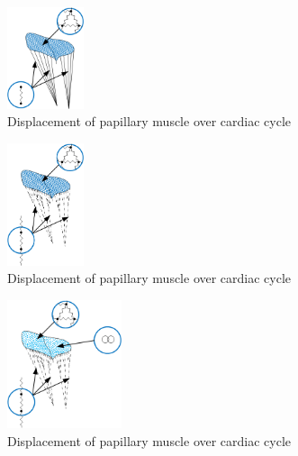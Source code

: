 \begin{figure}[H]\label{fig:pc1}
  \centering
  \includegraphics[width=0.2\textwidth]{./fig/pc1.png}
    \caption{Displacement of papillary muscle over cardiac cycle}    
\end{figure}
\begin{figure}[H]\label{fig:pc2}
  \centering
  \includegraphics[width=0.2\textwidth]{./fig/pc2.png}
    \caption{Displacement of papillary muscle over cardiac cycle}    
\end{figure}
\begin{figure}[H]\label{fig:pc3}
  \centering
  \includegraphics[width=0.3\textwidth]{./fig/pc3.png}
    \caption{Displacement of papillary muscle over cardiac cycle}    
\end{figure}
